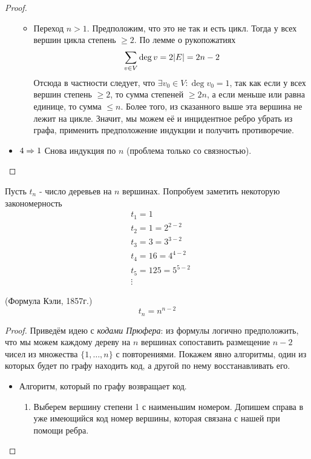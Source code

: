 \begin{multicols}{2}
\begin{proof}
\begin{itemize}
\begin{itemize}
          \item Переход $n > 1$. Предположим, что это не так и есть цикл. Тогда у всех вершин цикла степень $\ge 2$. По лемме о рукопожатиях
          \[
            \sum\limits_{v \in V} \deg v = 2|E| = 2n - 2
          \]
          Отсюда в частности следует, что $\exists v_0 \in V \colon \deg v_0 = 1$, так как если у всех вершин степень $\ge 2$, то сумма степеней $\ge 2n$, а если меньше или равна единице, то сумма $\le n$. Более того, из сказанного выше эта вершина не лежит на цикле. Значит, мы можем её и инцидентное ребро убрать из графа, применить предположение индукции и получить противоречие.
        \end{itemize}
    
        \item $4 \Rightarrow 1$ Снова индукция по $n$ (проблема только со связностью).
      \end{itemize}
    \end{proof}
    
    \Ex
      Пусть $t_n$ - число деревьев на $n$ вершинах. Попробуем заметить некоторую закономерность
      \begin{align*}
        &{t_1 = 1}
        \\
        &{t_2 = 1 = 2^{2 - 2}}
        \\
        &{t_3 = 3 = 3^{3 - 2}}
        \\
        &{t_4 = 16 = 4^{4 - 2}}
        \\
        &{t_5 = 125 = 5^{5 - 2}}
        \\
        &{\vdots}
      \end{align*}
    
    \begin{theorema}{(Формула Кэли, 1857г.)}{}
      \[
        t_n = n^{n - 2}
      \]
    \end{theorema}
    
    \begin{proof}
      Приведём идею с \textit{кодами Прюфера}: из формулы логично предположить, что мы можем каждому дереву на $n$ вершинах сопоставить размещение $n - 2$ чисел из множества $\{1, \ldots, n\}$ с повторениями. Покажем явно алгоритмы, один из которых будет по графу находить код, а другой по нему восстанавливать его.
      \begin{itemize}
        \item Алгоритм, который по графу возвращает код.
        \begin{enumerate}
          \item Выберем вершину степени 1 с наименьшим номером. Допишем справа в уже имеющийся код номер вершины, которая связана с нашей при помощи ребра.
          

\end{enumerate}
\end{itemize}
\end{proof}
\end{multicols}
